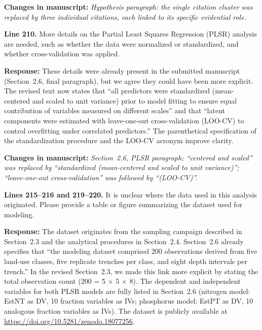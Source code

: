 \documentclass[11pt,a4paper]{article}
\newcommand{\response}[1]{\par\noindent\textcolor{responsecolor}{\textbf{Response:}} #1}
\newcommand{\change}[1]{\par\noindent\textcolor{changecolor}{\textbf{Changes in manuscript:}} \textit{#1}}
\begin{document}
\change{Hypothesis paragraph: the single citation cluster was replaced by three individual citations, each linked to its specific evidential role.}

\bigskip


\begin{reviewerbox}
\textbf{Line 210.} More details on the Partial Least Squares Regression (PLSR) analysis are needed, such as whether the data were normalized or standardized, and whether cross-validation was applied.
\end{reviewerbox}

\response{These details were already present in the submitted manuscript (Section~2.6, final paragraph), but we agree they could have been more explicit. The revised text now states that ``all predictors were standardized (mean-centered and scaled to unit variance) prior to model fitting to ensure equal contribution of variables measured on different scales'' and that ``latent components were estimated with leave-one-out cross-validation (LOO-CV) to control overfitting under correlated predictors.'' The parenthetical specification of the standardization procedure and the LOO-CV acronym improve clarity.}

\change{Section~2.6, PLSR paragraph: ``centered and scaled'' was replaced by ``standardized (mean-centered and scaled to unit variance)''; ``leave-one-out cross-validation'' was followed by ``(LOO-CV)''.}

\bigskip


\begin{reviewerbox}
\textbf{Lines 215--216 and 219--220.} It is unclear where the data used in this analysis originated. Please provide a table or figure summarizing the dataset used for modeling.
\end{reviewerbox}

\response{The dataset originates from the sampling campaign described in Section~2.3 and the analytical procedures in Section~2.4. Section~2.6 already specifies that ``the modeling dataset comprised 200 observations derived from five land-use classes, five replicate trenches per class, and eight depth intervals per trench.'' In the revised Section~2.3, we made this link more explicit by stating the total observation count (200 = 5 $\times$ 5 $\times$ 8). The dependent and independent variables for both PLSR models are fully listed in Section~2.6 (nitrogen model: EstNT as DV, 10 fraction variables as IVs; phosphorus model: EstPT as DV, 10 analogous fraction variables as IVs). The dataset is publicly available at \url{https://doi.org/10.5281/zenodo.18077256}.}
\end{document}
